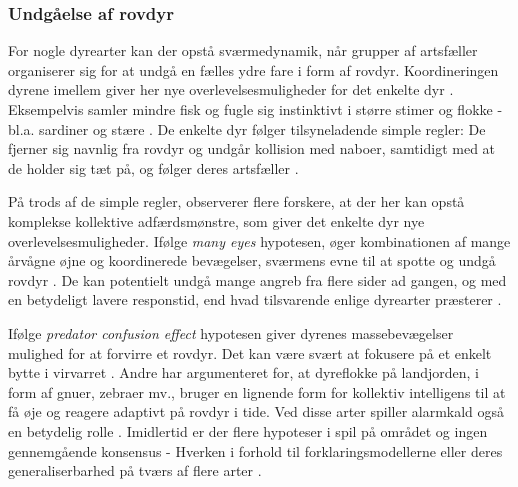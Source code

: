\subsubsection{Undgåelse af rovdyr}
For nogle dyrearter kan der opstå sværmedynamik, når grupper af artsfæller organiserer sig for at undgå en fælles ydre fare i form af rovdyr. Koordineringen dyrene imellem giver her nye overlevelsesmuligheder for det enkelte dyr \cite{chen2014}. Eksempelvis samler mindre fisk og fugle sig instinktivt i større stimer og flokke - bl.a. sardiner og stære \cite{fishschooling}\cite{sortsol}. De enkelte dyr følger tilsyneladende simple regler: De fjerner sig navnlig fra rovdyr og undgår kollision med naboer, samtidigt med at de holder sig tæt på, og følger deres artsfæller \cite{reynolds1987}.
\par
På trods af de simple regler, observerer flere forskere, at der her kan opstå komplekse kollektive adfærdsmønstre, som giver det enkelte dyr nye overlevelsesmuligheder. Ifølge \textit{many eyes} hypotesen, øger kombinationen af mange årvågne øjne og koordinerede bevægelser, sværmens evne til at spotte og undgå rovdyr \cite{fishschooling}. De kan potentielt undgå mange angreb fra flere sider ad gangen, og med en betydeligt lavere responstid, end hvad tilsvarende enlige dyrearter præsterer \cite{hoaremfl2004}.
\par %
Ifølge \textit{predator confusion effect} hypotesen giver dyrenes massebevægelser mulighed for at forvirre et rovdyr. Det kan være svært at fokusere på et enkelt bytte i virvarret \cite{jeschke2007}. Andre har argumenteret for, at dyreflokke på landjorden, i form af gnuer, zebraer mv., bruger en lignende form for kollektiv intelligens til at få øje og reagere adaptivt på rovdyr i tide. Ved disse arter spiller alarmkald også en betydelig rolle \cite{rosenberg2012}. Imidlertid er der flere hypoteser i spil på området og ingen gennemgående konsensus - Hverken i forhold til forklaringsmodellerne eller deres generaliserbarhed på tværs af flere arter \cite{conradt2011}. 


